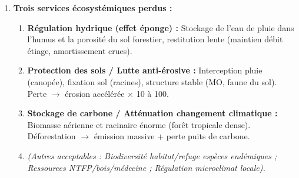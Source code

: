 \documentclass[11pt]{article}
\begin{document}
\begin{corrige}
\begin{enumerate}
    \item \textbf{Trois services écosystémiques perdus :}
    \begin{enumerate}
        \item \textbf{Régulation hydrique (effet éponge) :} Stockage de l'eau de pluie dans l'humus et la porosité du sol forestier, restitution lente (maintien débit étiage, amortissement crues).
        \item \textbf{Protection des sols / Lutte anti-érosive :} Interception pluie (canopée), fixation sol (racines), structure stable (MO, faune du sol). Perte $\rightarrow$ érosion accélérée $\times$ 10 à 100.
        \item \textbf{Stockage de carbone / Atténuation changement climatique :} Biomasse aérienne et racinaire énorme (forêt tropicale dense). Déforestation $\rightarrow$ émission  massive + perte puits de carbone.
        \item \textit{(Autres acceptables : Biodiversité habitat/refuge espèces endémiques ; Ressources NTFP/bois/médecine ; Régulation microclimat locale).}
    \end{enumerate}


\end{enumerate}
\end{corrige}
\end{document}

